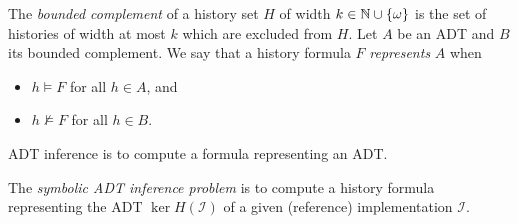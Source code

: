 The \emph{bounded complement} of a history set $H$ of width $k \in \mathbb{N} \cup
{\{{\omega}\}}$ is the set of histories of width at most $k$ which are excluded
from $H$. Let $A$ be an ADT and $B$ its bounded complement. We say that
a history formula $F$ \emph{represents} $A$ when
\begin{itemize}

  \item $h \models F$ for all $h \in A$, and

  \item $h \not\models F$ for all $h \in B$.

\end{itemize}
ADT inference is to compute a formula representing an ADT.

\begin{definition}

  The \emph{symbolic ADT inference problem} is to compute a history formula
  representing the ADT $\ker H(\mathcal{I})$ of a given (reference) implementation
  $\mathcal{I}$.

\end{definition}

